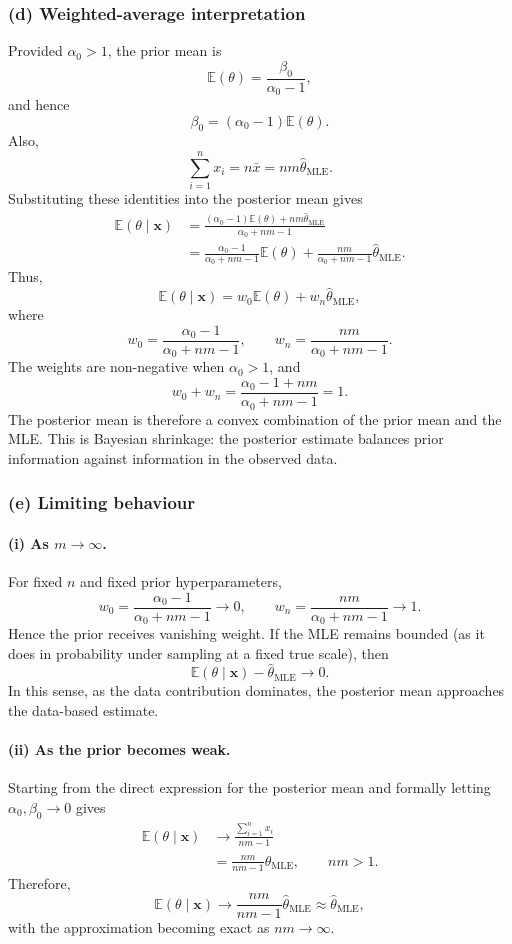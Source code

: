 \documentclass[11pt,a4paper]{article}
\newcommand{\given}{\mathrel{|}}
\newcommand{\xvec}{\boldsymbol{x}}
\newcommand{\E}{\mathbb{E}}
\begin{document}
\subsubsection*{(d) Weighted-average interpretation}

Provided $\alpha_0>1$, the prior mean is
\[
  \E(\theta)=\frac{\beta_0}{\alpha_0-1},
\]
and hence
\[
  \beta_0=(\alpha_0-1)\E(\theta).
\]
Also,
\[
  \sum_{i=1}^n x_i
  =n\bar{x}
  =nm\widehat{\theta}_{\mathrm{MLE}}.
\]
Substituting these identities into the posterior mean gives
\begin{align*}
  \E(\theta\given\xvec)
  &=\frac{(\alpha_0-1)\E(\theta)
           +nm\widehat{\theta}_{\mathrm{MLE}}}
          {\alpha_0+nm-1}\\
  &=\frac{\alpha_0-1}{\alpha_0+nm-1}\E(\theta)
    +\frac{nm}{\alpha_0+nm-1}
     \widehat{\theta}_{\mathrm{MLE}}.
\end{align*}
Thus,
\[
  \boxed{
    \E(\theta\given\xvec)
    =w_0\E(\theta)+w_n\widehat{\theta}_{\mathrm{MLE}}
  },
\]
where
\[
  w_0=\frac{\alpha_0-1}{\alpha_0+nm-1},
  \qquad
  w_n=\frac{nm}{\alpha_0+nm-1}.
\]
The weights are non-negative when $\alpha_0>1$, and
\[
  w_0+w_n
  =\frac{\alpha_0-1+nm}{\alpha_0+nm-1}
  =1.
\]
The posterior mean is therefore a convex combination of the prior mean and
the MLE. This is Bayesian shrinkage: the posterior estimate balances prior
information against information in the observed data.

\subsubsection*{(e) Limiting behaviour}

\paragraph{(i) As $m\to\infty$.}
For fixed $n$ and fixed prior hyperparameters,
\[
  w_0=\frac{\alpha_0-1}{\alpha_0+nm-1}\longrightarrow0,
  \qquad
  w_n=\frac{nm}{\alpha_0+nm-1}\longrightarrow1.
\]
Hence the prior receives vanishing weight. If the MLE remains bounded
(as it does in probability under sampling at a fixed true scale), then
\[
  \boxed{
    \E(\theta\given\xvec)
    -\widehat{\theta}_{\mathrm{MLE}}
    \longrightarrow0
  }.
\]
In this sense, as the data contribution dominates, the posterior mean
approaches the data-based estimate.

\paragraph{(ii) As the prior becomes weak.}
Starting from the direct expression for the posterior mean and formally
letting $\alpha_0,\beta_0\to0$ gives
\begin{align*}
  \E(\theta\given\xvec)
  &\longrightarrow
    \frac{\sum_{i=1}^n x_i}{nm-1}\\
  &=\frac{nm}{nm-1}\widehat{\theta}_{\mathrm{MLE}},
  \qquad nm>1.
\end{align*}
Therefore,
\[
  \boxed{
    \E(\theta\given\xvec)
    \longrightarrow
    \frac{nm}{nm-1}\widehat{\theta}_{\mathrm{MLE}}
    \approx\widehat{\theta}_{\mathrm{MLE}}
  },
\]
with the approximation becoming exact as $nm\to\infty$.
\end{document}
